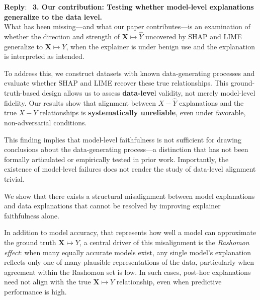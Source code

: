 \documentclass[11pt]{article}
\newcounter{se}[section]
\newenvironment{reply}
 {\par\medskip \noindent \begin{sf}\textbf{Reply}:\ }
 {\medskip \end{sf}}
\begin{document}
\begin{reply}
\noindent\textbf{3. Our contribution: Testing whether model-level explanations generalize to the data level.}\\
What has been missing—and what our paper contributes—is an examination of whether the direction and strength of $\mathbf{X}\mapsto \hat{Y}$ uncovered by SHAP and LIME generalize to $\mathbf{X} \mapsto Y$,  when the explainer is under benign use and the explanation is interpreted as intended.


To address this, we construct datasets with known data-generating processes and evaluate whether SHAP and LIME recover these true relationships. This ground-truth-based design allows us to assess \textbf{data-leve}l validity, not merely model-level fidelity. Our results show that alignment between $X-\hat{Y}$
 explanations and the true $X-Y$ relationships is \textbf{systematically unreliable}, even under favorable, non-adversarial conditions.


This finding implies that model-level faithfulness is not sufficient for drawing conclusions about the data-generating process—a distinction that has not been formally articulated or empirically tested in prior work. Importantly, the existence of model-level failures does not render the study of data-level alignment trivial. %

We show that there exists a structural misalignment between model explanations and data explanations that cannot be resolved by improving explainer faithfulness alone.

In addition to model accuracy, that represents how well a model can approximate the ground truth $\mathbf{X} \mapsto Y$, a central driver of this misalignment is the \emph{Rashomon effect}: when many equally accurate models exist, any single model’s explanation reflects only one of many plausible representations of the data, particularly when agreement within the Rashomon set is low. In such cases, post-hoc explanations need not align with the true $\mathbf{X} \mapsto Y$ relationship, even when predictive performance is high.


\end{reply}
\end{document}
